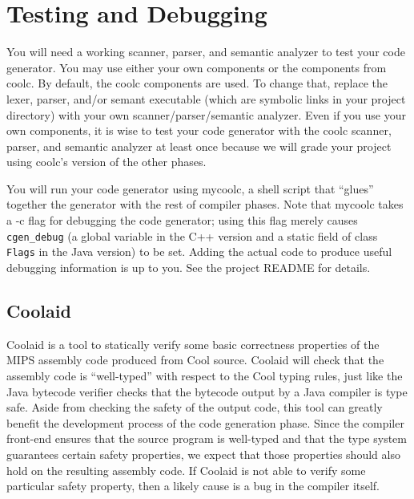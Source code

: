 \documentclass[11pt]{article}
\def\U#1{{\sf{}#1}}
\begin{document}
\section{Testing and Debugging}

You will need a working scanner, parser, and semantic analyzer to test
your code generator. You may use either your own components or the
components from \U{coolc}.  By default, the \U{coolc} components are
used.  To change that, replace the \U{lexer}, \U{parser}, and/or
\U{semant} executable (which are symbolic links in your project
directory) with your own scanner/parser/semantic analyzer.  Even if you use your own
components, it is wise to test your code generator with the \U{coolc}
scanner, parser, and semantic analyzer at least once because we will
grade your project using \U{coolc}'s version of the other phases.

You will run your code generator using \U{mycoolc}, a shell script
that ``glues'' together the generator with the rest of compiler
phases.  Note that \U{mycoolc} takes a \U{-c} flag for debugging the
code generator; using this flag merely causes {\tt cgen\_debug} (a
global variable in the C++ version and a static field of class {\tt
Flags} in the Java version) to be set.  Adding the actual code to
produce useful debugging information is up to you.  See the project
\U{README} for details.

\subsection{Coolaid}

\newcommand{\Coolaid}{\U{Coolaid}}

\Coolaid{} is a tool to statically verify some basic correctness
properties of the MIPS assembly code produced from Cool
source. \Coolaid{} will check that the assembly code is ``well-typed''
with respect to the Cool typing rules, just like the Java bytecode
verifier checks that the bytecode output by a Java compiler is type
safe. Aside from checking the safety of the output code, this tool can
greatly benefit the development process of the code generation
phase. Since the compiler front-end ensures that the source program is
well-typed and that the type system guarantees certain safety
properties, we expect that those properties should also hold on the
resulting assembly code. If \Coolaid{} is not able to verify some
particular safety property, then a likely cause is a bug in the
compiler itself.
\end{document}

